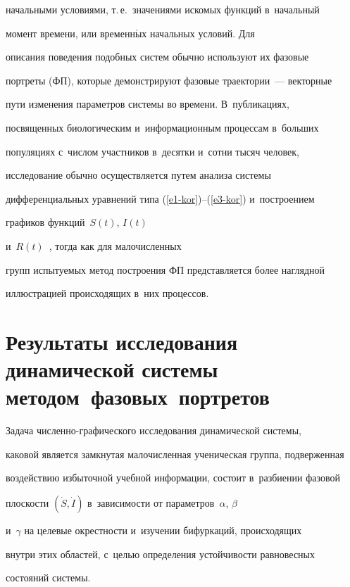начальными условиями, т.\,е.\ значениями искомых функций в~начальный 


момент времени, или временн$\acute{\mbox{ы}}$х начальных условий. Для 


описания поведения подобных сис\-тем обычно используют их фазовые 


портреты (ФП), которые демонстрируют фазовые траектории~--- векторные 


пути изменения па\-ра\-мет\-ров сис\-те\-мы во времени. В~публикациях, 


посвященных биологическим и~информационным процессам в~больших 


популяциях с~чис\-лом участ\-ни\-ков в~десятки и~сотни тысяч человек, 


исследование обычно осуществляется путем анализа системы 


дифференциальных уравнений типа (\ref{e1-kor})--(\ref{e3-kor}) и~построением 


графиков функций~$S(t)$, $I(t)$  


и~$R(t)$~\cite{1-kor, 2-kor, 3-kor, 5-kor, 6-kor}, тогда как для малочисленных 


групп ис\-пы\-ту\-емых метод построения ФП пред\-став\-ля\-ет\-ся более наглядной 


иллюстрацией происходящих в~них процессов. 





\section{Результаты исследования динамической системы методом~фазовых~портретов}





  Задача численно-гра\-фи\-че\-ско\-го исследования динамической системы, 


каковой является замкнутая ма\-ло\-чис\-лен\-ная ученическая группа, подверженная 


воздействию избыточной учебной информации, со\-сто\-ит в~разбиении фазовой 


плоскости $(\dot{S}, \dot{I})$ в~зависимости от па\-ра\-мет\-ров~$\alpha$, $\beta$ 


и~$\gamma$ на целевые окрест\-ности и~изуче\-нии би\-фур\-ка\-ций, происходящих 


внутри этих областей, с~целью определения устойчивости равновесных 


со\-сто\-яний сис\-темы.


